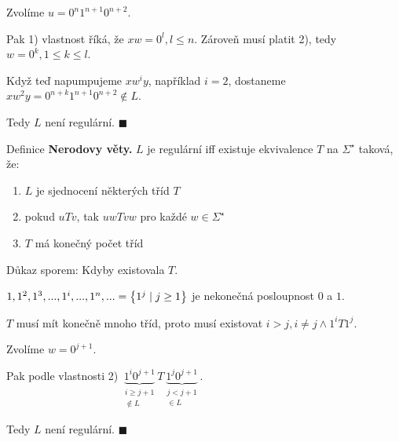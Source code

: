 Zvolíme $u = 0^n 1^{n+1} 0^{n+2}$.

Pak 1) vlastnost říká, že $xw = 0^l, l \leq n$. Zároveň musí platit 2), tedy $w = 0^k, 1 \leq k \leq l$.

Když teď napumpujeme $xw^i y$, například $i=2$, dostaneme $xw^2 y = 0^{n+k} 1^{n+1} 0^{n+2} \not\in L$.

Tedy $L$ není regulární. $\blacksquare$

Definice \textbf{Nerodovy věty.} $L$ je regulární iff existuje ekvivalence $T$ na $\Sigma^\star$ taková, že:
\begin{enumerate}[1), noitemsep]
    \item $L$ je sjednocení některých tříd $T$
    \item pokud $uTv$, tak $uwTvw$ pro každé $w \in \Sigma^\star$
    \item $T$ má konečný počet tříd
\end{enumerate}
Důkaz sporem:
Kdyby existovala $T$.

$1, 1^2, 1^3, ..., 1^i, ..., 1^n, ... = \left\lbrace 1^j \mid j \geq 1 \right\rbrace$ je nekonečná posloupnost $0$ a $1$.

$T$ musí mít konečně mnoho tříd, proto musí existovat $i > j, i \not= j \land 1^i T 1^j$.

Zvolíme $w = 0^{j + 1}$.

Pak podle vlastnosti 2) $\underbrace{1^i 0^{j+1}}_{\substack{i \geq j+1 \\ \not\in L}} T
\underbrace{1^j 0^{j+1}}_{\substack{j < j+1 \\\in L }}$.

Tedy $L$ není regulární. $\blacksquare$